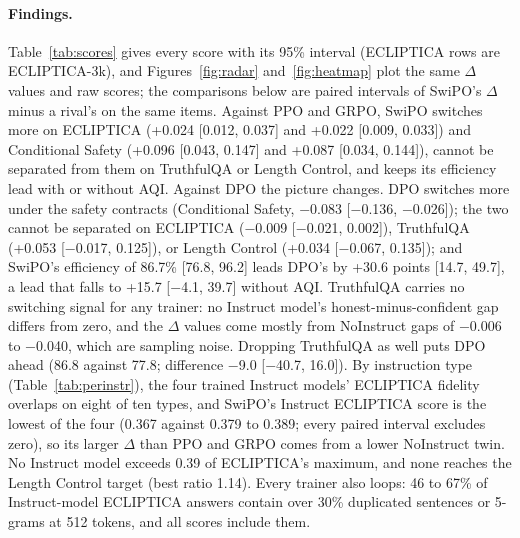 \documentclass[letterpaper]{article} %
\begin{document}
\paragraph{Findings.}
Table~\ref{tab:scores} gives every score with its 95\% interval (ECLIPTICA rows are ECLIPTICA-3k), and Figures~\ref{fig:radar} and~\ref{fig:heatmap} plot the same $\Delta$ values and raw scores; the comparisons below are paired intervals of SwiPO's $\Delta$ minus a rival's on the same items. Against PPO and GRPO, SwiPO switches more on ECLIPTICA (+0.024 [0.012, 0.037] and +0.022 [0.009, 0.033]) and Conditional Safety (+0.096 [0.043, 0.147] and +0.087 [0.034, 0.144]), cannot be separated from them on TruthfulQA or Length Control, and keeps its efficiency lead with or without AQI. Against DPO the picture changes. DPO switches more under the safety contracts (Conditional Safety, $-$0.083 [$-$0.136, $-$0.026]); the two cannot be separated on ECLIPTICA ($-$0.009 [$-$0.021, 0.002]), TruthfulQA (+0.053 [$-$0.017, 0.125]), or Length Control (+0.034 [$-$0.067, 0.135]); and SwiPO's efficiency of 86.7\% [76.8, 96.2] leads DPO's by +30.6 points [14.7, 49.7], a lead that falls to +15.7 [$-$4.1, 39.7] without AQI. TruthfulQA carries no switching signal for any trainer: no Instruct model's honest-minus-confident gap differs from zero, and the $\Delta$ values come mostly from NoInstruct gaps of $-$0.006 to $-$0.040, which are sampling noise. Dropping TruthfulQA as well puts DPO ahead (86.8 against 77.8; difference $-$9.0 [$-$40.7, 16.0]). By instruction type (Table~\ref{tab:perinstr}), the four trained Instruct models' ECLIPTICA fidelity overlaps on eight of ten types, and SwiPO's Instruct ECLIPTICA score is the lowest of the four (0.367 against 0.379 to 0.389; every paired interval excludes zero), so its larger $\Delta$ than PPO and GRPO comes from a lower NoInstruct twin. No Instruct model exceeds 0.39 of ECLIPTICA's maximum, and none reaches the Length Control target (best ratio 1.14). Every trainer also loops: 46 to 67\% of Instruct-model ECLIPTICA answers contain over 30\% duplicated sentences or 5-grams at 512 tokens, and all scores include them.
\end{document}
